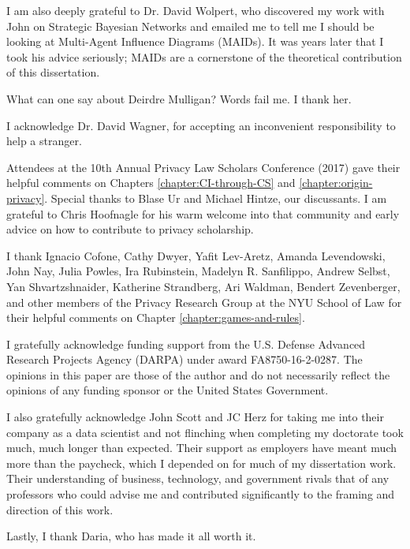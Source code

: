 \documentclass[../thesis.tex]{subfiles}
\begin{document}
 I am also deeply grateful to Dr. David Wolpert, who discovered
 my work with John on Strategic Bayesian Networks
 and emailed me to tell me I should be looking at
 Multi-Agent Influence Diagrams (MAIDs).
 It was years later that I took his advice seriously;
 MAIDs are a cornerstone of the theoretical contribution
 of this dissertation.

 What can one say about Deirdre Mulligan?
 Words fail me.
 I thank her.

 I acknowledge Dr. David Wagner, for accepting an
 inconvenient responsibility to help a stranger.

 Attendees at the 10th Annual Privacy Law Scholars Conference
 (2017) gave their helpful comments on
 Chapters \ref{chapter:CI-through-CS} and
 \ref{chapter:origin-privacy}.
 Special thanks to Blase Ur and Michael Hintze,
 our discussants.
 I am grateful to Chris Hoofnagle for his warm
 welcome into that community and early advice
 on how to contribute to privacy scholarship.

 I thank Ignacio Cofone, Cathy Dwyer, Yafit Lev-Aretz,
 Amanda Levendowski, John Nay, Julia Powles,
 Ira Rubinstein, Madelyn R. Sanfilippo, Andrew Selbst,
 Yan Shvartzshnaider,
 Katherine Strandberg, Ari Waldman, Bendert Zevenberger,  
 and other members of the Privacy Research Group at
 the NYU School of Law for their helpful comments
 on Chapter \ref{chapter:games-and-rules}.

 I gratefully acknowledge funding support 
 from the U.S. Defense Advanced Research Projects Agency (DARPA)
 under award FA8750-16-2-0287.
 The opinions in this paper are those of the author and do not
 necessarily reflect the opinions of any funding sponsor
 or the United States Government.

 I also gratefully acknowledge John Scott and JC Herz
 for taking me into their company as a data scientist and
 not flinching when completing my doctorate took much,
 much longer than expected.
 Their support as employers have meant much more than the paycheck,
 which I depended on for much of my dissertation work.
 Their understanding of business, technology, and government
 rivals that of any professors who could advise me
 and contributed significantly to the framing and direction
 of this work.
 
 Lastly, I thank Daria, who has made it all worth it.
\end{document}
